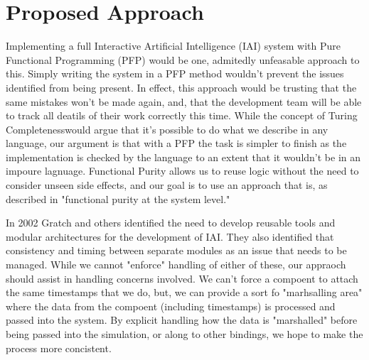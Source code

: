 


\section{Proposed Approach}

Implementing a full Interactive Artificial Intelligence (IAI) system with Pure Functional Programming (PFP) would be one, admitedly unfeasable approach to this.
    Simply writing the system in a PFP method wouldn't prevent the issues identified from being present. 
        In effect, this approach would be trusting that the same mistakes won't be made again, and, that the development team will be able to track all deatils of their work correctly this time.
    While the concept of Turing Completeness\footnotemark would argue that it's possible to do what we describe in any language, our argument is that with a PFP the task is simpler to finish as the implementation is checked by the language to an extent that it wouldn't be in an impoure lagnuage.
    Functional Purity allows us to reuse logic without the need to consider unseen side effects, and our goal is to use an approach that is, as described in\cite{perez2017testing} "functional purity at the system level."

In 2002 Gratch and others identified the need to develop reusable tools and modular architectures for the development of IAI.\cite{gratch_creating_2002}
They also identified that consistency and timing between separate modules as an issue that needs to be managed.
    While we cannot "enforce" handling of either of these, our appraoch should assist in handling concerns involved.
        We can't force a compoent to attach the same timestamps that we do, but, we can provide a sort fo "marhsalling area" where the data from the compoent (including timestamps) is processed and passed into the system.
    By explicit handling how the data is "marshalled" before being passed into the simulation, or along to other bindings, we hope to make the process more concistent.


